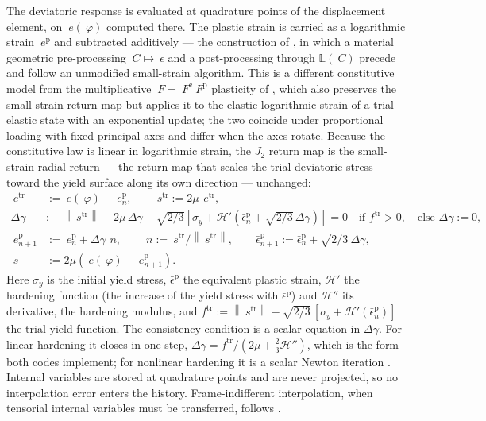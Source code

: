 \documentclass{article}
\newcommand{\F}{~F}
\newcommand{\C}{~C}
\newcommand{\eps}{~\epsilon}
\newcommand{\edev}{~e}
\newcommand{\sdev}{~s}
\newcommand{\disp}{~\varphi}
\newcommand{\norm}[1]{\left\lVert #1 \right\rVert}
\theoremstyle{definition}
\theoremstyle{plain}
\begin{document}
The deviatoric response is evaluated at quadrature points of the displacement
element, on $\edev(\disp)$ computed there. The plastic strain is carried as a
logarithmic strain $\edev^{\mathrm p}$ and subtracted additively --- the
construction of \textcite{Miehe.Apel.Lambrecht:2002}, in which a material
geometric pre-processing $\C \mapsto \eps$ and a post-processing through
$\mathbb{L}(\C)$ precede and follow an unmodified small-strain algorithm. This is a
different constitutive model from the multiplicative $\F = \F^{\mathrm e}
\F^{\mathrm p}$ plasticity of \textcite{Simo:1992}, which also preserves the
small-strain return map but applies it to the elastic logarithmic strain of a
trial elastic state with an exponential update; the two coincide under
proportional loading with fixed principal axes and differ when the axes rotate.
Because
the constitutive law is linear in logarithmic strain, the $J_2$ return map is
the small-strain radial return --- the return map that scales the trial
deviatoric stress toward the yield surface along its own direction ---
unchanged:
\begin{equation}
  \label{eq:return}
  \begin{split}
    \edev^{\mathrm{tr}} &:= \edev(\disp) - \edev^{\mathrm p}_n,
    \qquad
    \sdev^{\mathrm{tr}} := 2\mu\,\edev^{\mathrm{tr}},
    \\
    \Delta\gamma &: \quad
      \norm{\sdev^{\mathrm{tr}}} - 2\mu\,\Delta\gamma
      - \sqrt{2/3}\left[\sigma_y + \mathcal{H}'\!\left(\bar\epsilon^{\mathrm p}_n + \sqrt{2/3}\,\Delta\gamma\right)\right] = 0
      \quad\text{if } f^{\mathrm{tr}} > 0, \quad \text{else } \Delta\gamma := 0,
    \\
    \edev^{\mathrm p}_{n+1} &:= \edev^{\mathrm p}_n + \Delta\gamma\, ~n,
    \qquad ~n := \sdev^{\mathrm{tr}} / \norm{\sdev^{\mathrm{tr}}},
    \qquad
    \bar\epsilon^{\mathrm p}_{n+1} := \bar\epsilon^{\mathrm p}_n + \sqrt{2/3}\,\Delta\gamma,
    \\
    \sdev &:= 2\mu\left(\edev(\disp) - \edev^{\mathrm p}_{n+1}\right).
  \end{split}
\end{equation}
Here $\sigma_y$ is the initial yield stress, $\bar\epsilon^{\mathrm p}$ the
equivalent plastic strain, $\mathcal{H}'$ the hardening function (the increase
of the yield stress with $\bar\epsilon^{\mathrm p}$) and $\mathcal{H}''$ its
derivative, the hardening modulus, and
$f^{\mathrm{tr}} := \norm{\sdev^{\mathrm{tr}}} - \sqrt{2/3}\,[\sigma_y +
\mathcal{H}'(\bar\epsilon^{\mathrm p}_n)]$ the trial yield function. The
consistency condition is a scalar equation in $\Delta\gamma$. For linear
hardening it closes in one step,
$\Delta\gamma = f^{\mathrm{tr}}/(2\mu + \tfrac23\mathcal{H}'')$, which is the
form both codes implement; for nonlinear hardening it is a scalar Newton
iteration \cite[BOX~3.2]{SimoHughes:1998}. Internal variables are stored at quadrature points and
are never projected, so no interpolation error enters the history. Frame-indifferent interpolation, when
tensorial internal variables must be transferred, follows
\textcite{Mota.etal:2013}.
\end{document}
